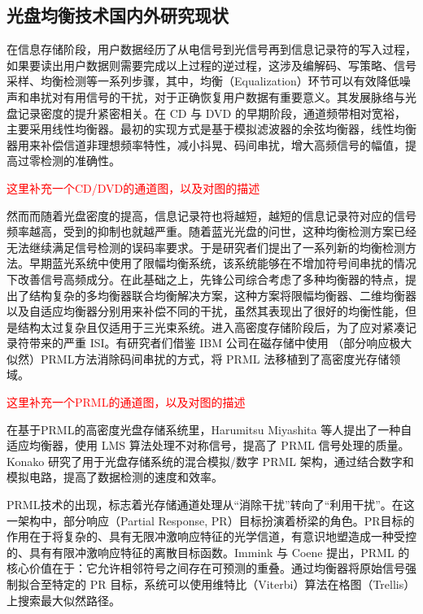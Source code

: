 \subsection{光盘均衡技术国内外研究现状}

在信息存储阶段，用户数据经历了从电信号到光信号再到信息记录符的写入过程，如果要读出用户数据则需要完成以上过程的逆过程，这涉及编解码、写策略、信号采样、均衡检测等一系列步骤，其中，均衡（Equalization）环节可以有效降低噪声和串扰对有用信号的干扰，对于正确恢复用户数据有重要意义。其发展脉络与光盘记录密度的提升紧密相关。在 CD 与 DVD 的早期阶段，通道频带相对宽裕，主要采用线性均衡器。最初的实现方式是基于模拟滤波器的余弦均衡器，线性均衡器用来补偿信道非理想频率特性，减小抖晃、码间串扰，增大高频信号的幅值，提高过零检测的准确性。


\textcolor{red}{这里补充一个CD/DVD的通道图，以及对图的描述}


然而而随着光盘密度的提高，信息记录符也将越短，越短的信息记录符对应的信号频率越高，受到的抑制也就越严重。随着蓝光光盘的问世，这种均衡检测方案已经无法继续满足信号检测的误码率要求。于是研究者们提出了一系列新的均衡检测方法。早期蓝光系统中使用了限幅均衡系统，该系统能够在不增加符号间串扰的情况下改善信号高频成分\cite{bluray2015white}。在此基础之上，先锋公司综合考虑了多种均衡器的特点，提出了结构复杂的多均衡器联合均衡解决方案\cite{stek2002advanced}，这种方案将限幅均衡器、二维均衡器以及自适应均衡器分别用来补偿不同的干扰，虽然其表现出了很好的均衡性能，但是结构太过复杂且仅适用于三光束系统。进入高密度存储阶段后，为了应对紧凑记录符带来的严重 ISI。有研究者们借鉴 IBM 公司在磁存储中使用 （部分响应极大似然）PRML方法消除码间串扰的方式，将 PRML 法移植到了高密度光存储领域。

\textcolor{red}{这里补充一个PRML的通道图，以及对图的描述}

在基于PRML的高密度光盘存储系统里，Harumitsu Miyashita\cite{miyashita2002new} 等人提出了一种自适应均衡器，使用 LMS 算法处理不对称信号，提高了 PRML 信号处理的质量。Konako\cite{konakov2004high} 研究了用于光盘存储系统的混合模拟/数字 PRML 架构，通过结合数字和模拟电路，提高了数据检测的速度和效率。

PRML技术的出现，标志着光存储通道处理从“消除干扰”转向了“利用干扰”。在这一架构中，部分响应（Partial Response, PR）目标扮演着桥梁的角色。PR目标的作用在于将复杂的、具有无限冲激响应特征的光学信道，有意识地塑造成一种受控的、具有有限冲激响应特征的离散目标函数。Immink 与 Coene \cite{immink2004adaptation} 提出，PRML 的核心价值在于：它允许相邻符号之间存在可预测的重叠。通过均衡器将原始信号强制拟合至特定的 PR 目标，系统可以使用维特比（Viterbi）算法在格图（Trellis）上搜索最大似然路径。

